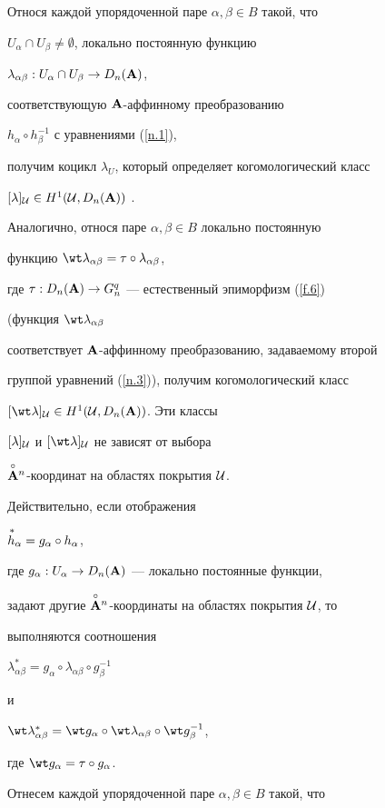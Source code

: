 Относя каждой упорядоченной паре $\alpha, \beta \in B$ такой, что


$U_\alpha\cap U_\beta\ne\emptyset$, локально постоянную функцию


$\lambda_{\alpha\beta}:U_\alpha\cap U_\beta\to D_n({\bold A})$,


соответствующую ${\bold A}$-аффинному преобразованию


$h_\alpha \circ h_\beta^{-1}$ с уравнениями (\ref{n.1}),


получим коцикл $\lambda_U$, который определяет когомологический класс


$[\lambda]_{\cal U}\in H^1 ({\cal U}, D_n({\bold A}))$ \cite{Hirz}.


Аналогично, относя паре $\alpha, \beta \in B$ локально постоянную


функцию $\wt\lambda_{\alpha \beta}=\tau\circ\lambda_{\alpha\beta}$,


где $\tau:D_n({\bold A})\to G^q_n$ --- естественный эпиморфизм (\ref{f.6}) 


(функция $\wt\lambda_{\alpha \beta}$


соответствует ${\bold A}$-аффинному преобразованию, задаваемому второй


группой уравнений (\ref{n.3})), получим когомологический класс


$[\wt\lambda]_{\cal U}\in H^1({\cal U}, D_n(\A))$. Эти классы


$[\lambda]_{\cal U}$ и $[\wt\lambda]_{\cal U}$ не зависят от выбора


$\overset{\circ}{\bold A}{}^n$-координат на областях покрытия $\cal U$.


Действительно, если отображения


${\overset{\,\ast}{h}{}}_\alpha=g_\alpha\circ h_\alpha$,


где $g_\alpha:U_\alpha\to D_n({\bold A})$ --- локально постоянные функции,


задают другие $\overset{\circ}{\bold A}{}^n$-координаты на областях покрытия $\cal U$, то


выполняются соотношения


$\lambda^*_{\alpha\beta}=g_\alpha\circ\lambda_{\alpha\beta}


\circ g^{-1}_\beta$


и


$\wt\lambda^*_{\alpha\beta}=\wt g_\alpha\circ


\wt\lambda_{\alpha\beta}\circ\wt g^{-1}_\beta$,


где $\wt g_\alpha=\tau\circ g_\alpha$.


Отнесем каждой упорядоченной паре $\alpha, \beta\in B$ такой, что


